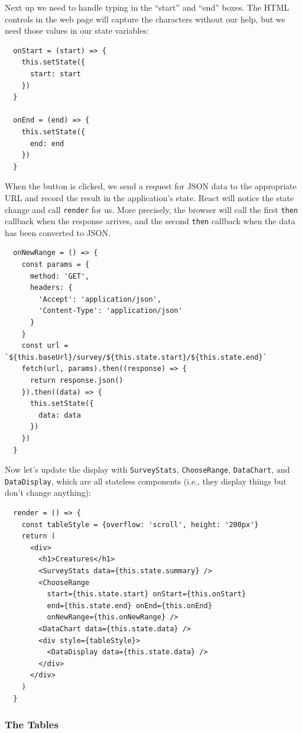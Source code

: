 Next up we need to handle typing in the ``start'' and ``end'' boxes. The
HTML controls in the web page will capture the characters without our
help, but we need those values in our state variables:

\begin{verbatim}
  onStart = (start) => {
    this.setState({
      start: start
    })
  }

  onEnd = (end) => {
    this.setState({
      end: end
    })
  }
\end{verbatim}

When the button is clicked, we send a request for JSON data to the
appropriate URL and record the result in the application's state. React
will notice the state change and call \texttt{render} for us. More
precisely, the browser will call the first \texttt{then} callback when
the response arrives, and the second \texttt{then} callback when the
data has been converted to JSON.

\begin{verbatim}
  onNewRange = () => {
    const params = {
      method: 'GET',
      headers: {
        'Accept': 'application/json',
        'Content-Type': 'application/json'
      }
    }
    const url = `${this.baseUrl}/survey/${this.state.start}/${this.state.end}`
    fetch(url, params).then((response) => {
      return response.json()
    }).then((data) => {
      this.setState({
        data: data
      })
    })
  }
\end{verbatim}

Now let's update the display with \texttt{SurveyStats},
\texttt{ChooseRange}, \texttt{DataChart}, and \texttt{DataDisplay},
which are all stateless components (i.e., they display things but don't
change anything):

\begin{verbatim}
  render = () => {
    const tableStyle = {overflow: 'scroll', height: '200px'}
    return (
      <div>
        <h1>Creatures</h1>
        <SurveyStats data={this.state.summary} />
        <ChooseRange
          start={this.state.start} onStart={this.onStart}
          end={this.state.end} onEnd={this.onEnd}
          onNewRange={this.onNewRange} />
        <DataChart data={this.state.data} />
        <div style={tableStyle}>
          <DataDisplay data={this.state.data} />
        </div>
      </div>
    )
  }
\end{verbatim}

\subsubsection{The Tables}\label{s:capstone-tables}

